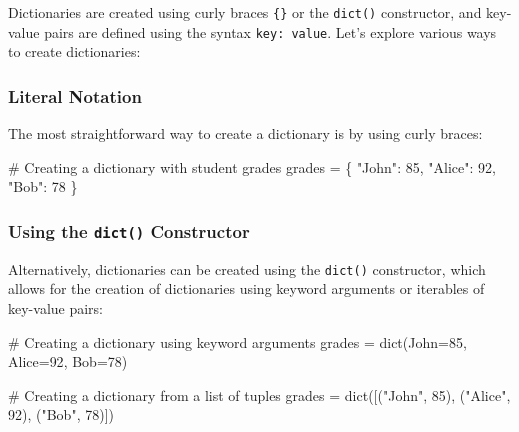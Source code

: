 \documentclass[
  letterpaper,
  DIV=11,
  numbers=noendperiod]{scrreprt}
\newenvironment{Shaded}{\begin{snugshade}}{\end{snugshade}}
\newcommand{\BuiltInTok}[1]{\textcolor[rgb]{0.00,0.23,0.31}{#1}}
\newcommand{\CommentTok}[1]{\textcolor[rgb]{0.37,0.37,0.37}{#1}}
\newcommand{\DecValTok}[1]{\textcolor[rgb]{0.68,0.00,0.00}{#1}}
\newcommand{\NormalTok}[1]{\textcolor[rgb]{0.00,0.23,0.31}{#1}}
\newcommand{\OperatorTok}[1]{\textcolor[rgb]{0.37,0.37,0.37}{#1}}
\newcommand{\StringTok}[1]{\textcolor[rgb]{0.13,0.47,0.30}{#1}}
\begin{document}
Dictionaries are created using curly braces \texttt{\{\}} or the
\texttt{dict()} constructor, and key-value pairs are defined using the
syntax \texttt{key:\ value}. Let's explore various ways to create
dictionaries:

\hypertarget{literal-notation}{%
\subsubsection{Literal Notation}\label{literal-notation}}

The most straightforward way to create a dictionary is by using curly
braces:

\begin{Shaded}
\begin{Highlighting}[]
\CommentTok{\# Creating a dictionary with student grades}
\NormalTok{grades }\OperatorTok{=}\NormalTok{ \{}
    \StringTok{"John"}\NormalTok{: }\DecValTok{85}\NormalTok{,}
    \StringTok{"Alice"}\NormalTok{: }\DecValTok{92}\NormalTok{,}
    \StringTok{"Bob"}\NormalTok{: }\DecValTok{78}
\NormalTok{\}}
\end{Highlighting}
\end{Shaded}

\hypertarget{using-the-dict-constructor}{%
\subsubsection{\texorpdfstring{Using the \texttt{dict()}
Constructor}{Using the dict() Constructor}}\label{using-the-dict-constructor}}

Alternatively, dictionaries can be created using the \texttt{dict()}
constructor, which allows for the creation of dictionaries using keyword
arguments or iterables of key-value pairs:

\begin{Shaded}
\begin{Highlighting}[]
\CommentTok{\# Creating a dictionary using keyword arguments}
\NormalTok{grades }\OperatorTok{=} \BuiltInTok{dict}\NormalTok{(John}\OperatorTok{=}\DecValTok{85}\NormalTok{, Alice}\OperatorTok{=}\DecValTok{92}\NormalTok{, Bob}\OperatorTok{=}\DecValTok{78}\NormalTok{)}

\CommentTok{\# Creating a dictionary from a list of tuples}
\NormalTok{grades }\OperatorTok{=} \BuiltInTok{dict}\NormalTok{([(}\StringTok{"John"}\NormalTok{, }\DecValTok{85}\NormalTok{), (}\StringTok{"Alice"}\NormalTok{, }\DecValTok{92}\NormalTok{), (}\StringTok{"Bob"}\NormalTok{, }\DecValTok{78}\NormalTok{)])}
\end{Highlighting}
\end{Shaded}
\end{document}
